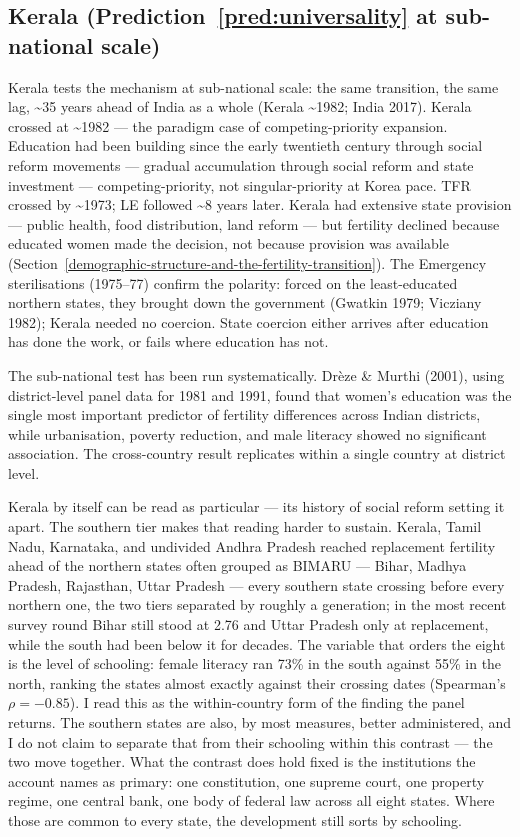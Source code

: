 \documentclass[12pt,letterpaper]{article}
\begin{document}
\subsection{Kerala (Prediction~\ref{pred:universality} at sub-national scale)}\label{kerala}

Kerala tests the mechanism at sub-national scale: the same transition,
the same lag, \textasciitilde35 years ahead of India as a whole
(Kerala \textasciitilde1982; India 2017). Kerala
crossed at \textasciitilde1982 --- the paradigm case of
competing-priority expansion. Education had been building since the
early twentieth century through social reform movements --- gradual
accumulation through social reform and state investment ---
competing-priority, not singular-priority at Korea pace. TFR
crossed by \textasciitilde1973; LE followed \textasciitilde8 years
later. Kerala had extensive state provision --- public health, food
distribution, land reform --- but fertility declined because educated
women made the decision, not because provision was available
(Section~\ref{demographic-structure-and-the-fertility-transition}). The
Emergency sterilisations (1975--77) confirm the polarity: forced on
the least-educated northern states, they brought down the government
(Gwatkin 1979; Vicziany 1982); Kerala needed no coercion. State
coercion either arrives after education has done the work, or fails
where education has not.

The sub-national test has been run systematically. Drèze \& Murthi
(2001), using district-level panel data for 1981 and 1991, found that
women's education was the single most important predictor of fertility
differences across Indian districts, while urbanisation, poverty
reduction, and male literacy showed no significant association. The
cross-country result replicates within a single country at district
level.

Kerala by itself can be read as particular --- its history of social
reform setting it apart. The southern tier makes that reading harder to
sustain. Kerala, Tamil Nadu, Karnataka, and undivided Andhra Pradesh
reached replacement fertility ahead of the northern states often grouped
as BIMARU --- Bihar, Madhya Pradesh, Rajasthan, Uttar Pradesh --- every
southern state crossing before every northern one, the two tiers
separated by roughly a generation; in the most recent survey round Bihar
still stood at 2.76 and Uttar Pradesh only at replacement, while the
south had been below it for decades. The variable that orders the eight
is the level of schooling: female literacy ran 73\% in the south against
55\% in the north, ranking the states almost exactly against their
crossing dates (Spearman's $\rho = -0.85$). I read this as the
within-country form of the finding the panel returns. The southern states
are also, by most measures, better administered, and I do not claim to
separate that from their schooling within this contrast --- the two move
together. What the contrast does hold fixed is the institutions the
account names as primary: one constitution, one supreme court, one
property regime, one central bank, one body of federal law across all
eight states. Where those are common to every state, the development still
sorts by schooling.
\end{document}
